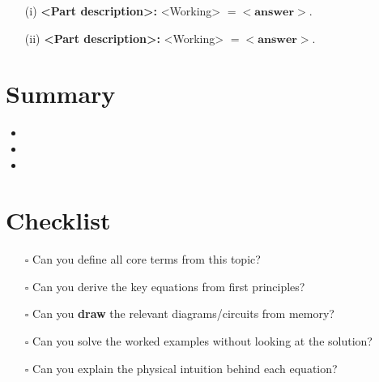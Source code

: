 \documentclass[11pt,a4paper]{article}
\begin{document}
\begin{enumerate}[leftmargin=1.5em, itemsep=2pt]
  \item[(i)] \textbf{<Part description>:}
    <Working> $= \mathbf{<answer>}$.

  \item[(ii)] \textbf{<Part description>:}
    <Working> $= \mathbf{<answer>}$.
\end{enumerate}

\section*{Summary}

\begin{itemize}[leftmargin=1.5em, itemsep=2pt]
  \item <Key takeaway 1 --- include the core equation or fact>
  \item <Key takeaway 2 --- note any common pitfalls>
  \item <Key takeaway 3 --- link to related topics>
\end{itemize}

\section*{Checklist}

\begin{itemize}[leftmargin=1.5em, itemsep=1pt]
  \item[$\square$] Can you define all core terms from this topic?
  \item[$\square$] Can you derive the key equations from first principles?
  \item[$\square$] Can you \textbf{draw} the relevant diagrams/circuits from memory?
  \item[$\square$] Can you solve the worked examples without looking at the solution?
  \item[$\square$] Can you explain the physical intuition behind each equation?
\end{itemize}
\end{document}
